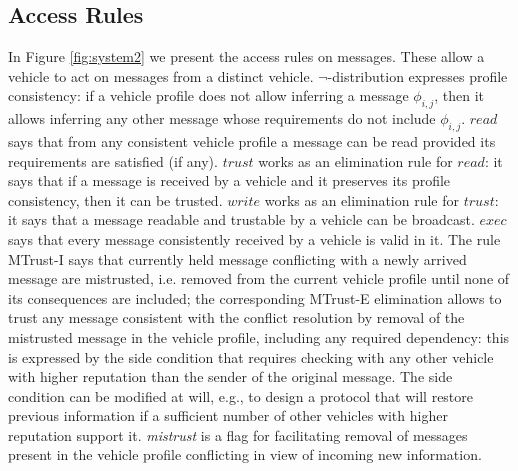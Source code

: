 \documentclass[compsoc, conference, letterpaper, 10pt, times]{IEEEtran}
\begin{document}
\subsection{Access Rules}

In Figure \ref{fig:system2} we present the access rules on messages. These allow a vehicle to act on messages from a distinct vehicle. $\neg$-distribution expresses profile consistency: if a vehicle profile does not allow inferring a message $\phi_{i,j}$, then it allows inferring any other message whose requirements do not include $\phi_{i,j}$. $\mathit{read}$ says that from any consistent vehicle profile a message can be read provided its requirements are satisfied (if any). $\mathit{trust}$ works as an elimination rule for $read$: it says that if a message is received by a vehicle and it preserves its profile consistency, then it can be trusted. $\mathit{write}$ works as an elimination rule for $trust$: it says that a message readable and trustable by a vehicle can be broadcast. $\mathit{exec}$ says that every message consistently received by a vehicle is valid in it. The rule MTrust-I says that currently held message conflicting with a newly arrived message are mistrusted, i.e. removed from the current vehicle profile until none of its consequences are included; the corresponding MTrust-E elimination allows to trust any message consistent with the conflict resolution by removal of the mistrusted message in the vehicle profile, including any required dependency: this is expressed by the side condition that requires checking with any other vehicle with higher reputation than the sender of the original message. The side condition can be modified at will, e.g., to design a protocol that will restore previous information if a sufficient number of other vehicles with higher reputation support it. \textit{mistrust} is a flag for facilitating removal of messages present in the vehicle profile conflicting in view of incoming new information. 
\end{document}
